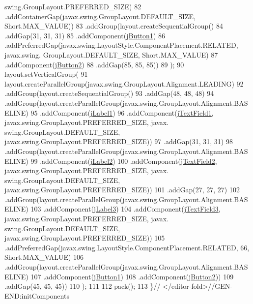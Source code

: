 \begin{DoxyCode}
      swing.GroupLayout.PREFERRED\_SIZE)
82                 .addContainerGap(javax.swing.GroupLayout.DEFAULT\_SIZE, Short.MAX\_VALUE))
83             .addGroup(layout.createSequentialGroup()
84                 .addGap(31, 31, 31)
85                 .addComponent(\mbox{\hyperlink{class_interfaz_package_1_1_busqueda_facturas_aef5c93b206e8f2f6983c85a8cdbc95d1}{jButton1}})
86                 .addPreferredGap(javax.swing.LayoutStyle.ComponentPlacement.RELATED, javax.swing.
      GroupLayout.DEFAULT\_SIZE, Short.MAX\_VALUE)
87                 .addComponent(\mbox{\hyperlink{class_interfaz_package_1_1_busqueda_facturas_a667ec2eeb636b4f1822e8f77376ec3ca}{jButton2}})
88                 .addGap(85, 85, 85))
89         );
90         layout.setVerticalGroup(
91             layout.createParallelGroup(javax.swing.GroupLayout.Alignment.LEADING)
92             .addGroup(layout.createSequentialGroup()
93                 .addGap(48, 48, 48)
94                 .addGroup(layout.createParallelGroup(javax.swing.GroupLayout.Alignment.BASELINE)
95                     .addComponent(\mbox{\hyperlink{class_interfaz_package_1_1_busqueda_facturas_a3cb5b1df90ba3c664ab24c9ddc288a2e}{jLabel1}})
96                     .addComponent(\mbox{\hyperlink{class_interfaz_package_1_1_busqueda_facturas_ac7cfc9bbf0501c53bb3014890e92efc2}{jTextField1}}, javax.swing.GroupLayout.PREFERRED\_SIZE, javax.
      swing.GroupLayout.DEFAULT\_SIZE, javax.swing.GroupLayout.PREFERRED\_SIZE))
97                 .addGap(31, 31, 31)
98                 .addGroup(layout.createParallelGroup(javax.swing.GroupLayout.Alignment.BASELINE)
99                     .addComponent(\mbox{\hyperlink{class_interfaz_package_1_1_busqueda_facturas_ad742b0bf64188b05a8296fd972b67b47}{jLabel2}})
100                     .addComponent(\mbox{\hyperlink{class_interfaz_package_1_1_busqueda_facturas_a3bc720241bb5aea5badbbc7937d79292}{jTextField2}}, javax.swing.GroupLayout.PREFERRED\_SIZE, javax.
      swing.GroupLayout.DEFAULT\_SIZE, javax.swing.GroupLayout.PREFERRED\_SIZE))
101                 .addGap(27, 27, 27)
102                 .addGroup(layout.createParallelGroup(javax.swing.GroupLayout.Alignment.BASELINE)
103                     .addComponent(\mbox{\hyperlink{class_interfaz_package_1_1_busqueda_facturas_a92d227beb642242b3952cdd159970c32}{jLabel3}})
104                     .addComponent(\mbox{\hyperlink{class_interfaz_package_1_1_busqueda_facturas_aadd306dde44841b9ab43c6753b3df0d7}{jTextField3}}, javax.swing.GroupLayout.PREFERRED\_SIZE, javax.
      swing.GroupLayout.DEFAULT\_SIZE, javax.swing.GroupLayout.PREFERRED\_SIZE))
105                 .addPreferredGap(javax.swing.LayoutStyle.ComponentPlacement.RELATED, 66, Short.MAX\_VALUE)
106                 .addGroup(layout.createParallelGroup(javax.swing.GroupLayout.Alignment.BASELINE)
107                     .addComponent(\mbox{\hyperlink{class_interfaz_package_1_1_busqueda_facturas_aef5c93b206e8f2f6983c85a8cdbc95d1}{jButton1}})
108                     .addComponent(\mbox{\hyperlink{class_interfaz_package_1_1_busqueda_facturas_a667ec2eeb636b4f1822e8f77376ec3ca}{jButton2}}))
109                 .addGap(45, 45, 45))
110         );
111 
112         pack();
113     \}\textcolor{comment}{// </editor-fold>//GEN-END:initComponents}
\end{DoxyCode}
